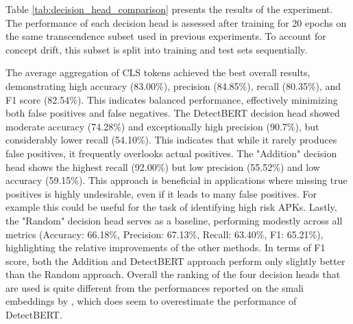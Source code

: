 Table \ref{tab:decision_head_comparison} presents the results of the experiment.
The performance of each decision head is assessed after training for 20 epochs on 
the same transcendence subset used in previous experiments.
To account for concept drift, this subset is split into training and test sets sequentially.

\begin{table}[b]
    \centering
    \caption{\label{tab:decision_head_comparison}Performance comparison of different decision heads on the Transcend dataset with a time-based split.}
\end{table}

The average aggregation of CLS tokens achieved the best overall results, 
demonstrating high accuracy (83.00\%), precision (84.85\%), recall (80.35\%), 
and F1 score (82.54\%). This indicates balanced performance, 
effectively minimizing both false positives and false negatives.
The DetectBERT decision head showed moderate accuracy (74.28\%) 
and exceptionally high precision (90.7\%), but considerably lower recall (54.10\%). 
This indicates that while it rarely produces false positives, 
it frequently overlooks actual positives. 
The "Addition" decision head shows the highest recall (92.00\%) but low precision 
(55.52\%) and low accuracy (59.15\%). 
This approach is beneficial in applications where missing true positives is highly 
undesirable, even if it leads to many false positives. For example this could be useful 
for the task of identifying high risk APKs.
Lastly, the "Random" decision head serves as a baseline, 
performing modestly across all metrics (Accuracy: 66.18\%, Precision: 67.13\%, 
Recall: 63.40\%, F1: 65.21\%), 
highlighting the relative improvements of the other methods.
In terms of F1 score, both the Addition and DetectBERT approach perform only slightly better 
than the Random approach.
Overall the ranking of the four decision heads that are used is quite different from the 
performances reported on the smali embeddings by \cite{detectbert}, which does seem to 
overestimate the performance of DetectBERT.

